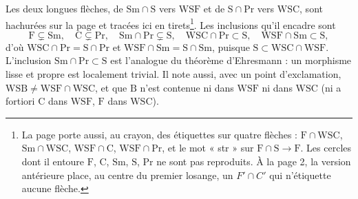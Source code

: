 \documentclass[11pt,a4paper]{article}
\begin{document}

Les deux longues flèches, de $\mathrm{Sm} \cap \mathrm{S}$ vers $\mathrm{WSF}$
et de $\mathrm{S} \cap \mathrm{Pr}$ vers $\mathrm{WSC}$, sont hachurées sur la
page et tracées ici en tirets\footnote{La page porte aussi, au crayon, des
étiquettes sur quatre flèches : $\mathrm{F} \cap \mathrm{WSC}$,
$\mathrm{Sm} \cap \mathrm{WSC}$, $\mathrm{WSF} \cap \mathrm{C}$,
$\mathrm{WSF} \cap \mathrm{Pr}$, et le mot « str » sur
$\mathrm{F} \cap \mathrm{S} \to \mathrm{F}$. Les cercles dont il entoure
$\mathrm{F}$, $\mathrm{C}$, $\mathrm{Sm}$, $\mathrm{S}$, $\mathrm{Pr}$ ne
sont pas reproduits. À la page 2, la version antérieure place, au centre du
premier losange, un $F' \cap C'$ qui n'étiquette aucune flèche.}. Les
inclusions qu'il encadre sont
\[
\mathrm{F} \subsetneq \mathrm{Sm}, \quad \mathrm{C} \subsetneq \mathrm{Pr},
\quad \mathrm{Sm} \cap \mathrm{Pr} \subsetneq \mathrm{S}, \quad
\mathrm{WSC} \cap \mathrm{Pr} \subset \mathrm{S}, \quad
\mathrm{WSF} \cap \mathrm{Sm} \subset \mathrm{S},
\]
d'où $\mathrm{WSC} \cap \mathrm{Pr} = \mathrm{S} \cap \mathrm{Pr}$ et
$\mathrm{WSF} \cap \mathrm{Sm} = \mathrm{S} \cap \mathrm{Sm}$, puisque
$\mathrm{S} \subset \mathrm{WSC} \cap \mathrm{WSF}$. L'inclusion
$\mathrm{Sm} \cap \mathrm{Pr} \subset \mathrm{S}$ est l'analogue du théorème
d'Ehresmann : un morphisme lisse et propre est localement trivial. Il note
aussi, avec un point d'exclamation, $\mathrm{WSB} \neq \mathrm{WSF} \cap
\mathrm{WSC}$, et que $\mathrm{B}$ n'est contenue ni dans $\mathrm{WSF}$ ni
dans $\mathrm{WSC}$ (ni a fortiori $\mathrm{C}$ dans $\mathrm{WSF}$,
$\mathrm{F}$ dans $\mathrm{WSC}$).
\end{document}
